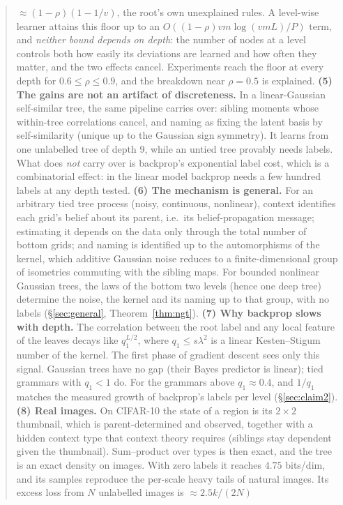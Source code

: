 \documentclass[11pt]{article}
\theoremstyle{definition}
\begin{document}
\begin{abstract}
$\approx(1-\rho)(1-1/v)$, the root's own unexplained rules. A level-wise learner attains this
floor up to an $O((1-\rho)vm\log(vmL)/P)$ term, and \emph{neither bound depends on depth}: the
number of nodes at a level controls both how easily its deviations are learned and how often they
matter, and the two effects cancel. Experiments reach the floor at every depth for
$0.6\le\rho\le0.9$, and the breakdown near $\rho=0.5$ is explained.
\textbf{(5) The gains are not an artifact of discreteness.} In a linear-Gaussian self-similar
tree, the same pipeline carries over: sibling moments whose within-tree correlations cancel, and
naming as fixing the latent basis by self-similarity (unique up to the Gaussian sign symmetry).
It learns from one unlabelled tree of depth 9, while an untied tree provably needs labels. What
does \emph{not} carry over is backprop's exponential label cost, which is a combinatorial effect:
in the linear model backprop needs a few hundred labels at any depth tested.
\textbf{(6) The mechanism is general.} For an arbitrary tied tree process (noisy, continuous,
nonlinear), context identifies each grid's belief about its parent, i.e.\ its belief-propagation
message; estimating it depends on the data only through the total number of bottom grids; and
naming is identified up to the automorphisms of the kernel, which additive Gaussian noise reduces
to a finite-dimensional group of isometries commuting with the sibling maps. For bounded nonlinear
Gaussian trees, the laws of the bottom two levels (hence one deep tree) determine the noise, the
kernel and its naming up to that group, with no labels (\S\ref{sec:general}, Theorem~\ref{thm:ngt}).
\textbf{(7) Why backprop slows with depth.} The correlation between the root label and any local
feature of the leaves decays like $q_1^{L/2}$, where $q_1\le s\lambda^2$ is a linear Kesten--Stigum
number of the kernel. The first phase of gradient descent sees only this signal. Gaussian trees have
no gap (their Bayes predictor is linear); tied grammars with $q_1<1$ do. For the grammars above
$q_1\approx0.4$, and $1/q_1$ matches the measured growth of backprop's labels per level
(\S\ref{sec:claim2}).
\textbf{(8) Real images.} On CIFAR-10 the state of a region is its $2\times2$ thumbnail, which is
parent-determined and observed, together with a hidden context type that context theory requires
(siblings stay dependent given the thumbnail). Sum--product over types is then exact, and the tree is an
exact density on images. With zero labels it reaches $4.75$ bits/dim, and its samples reproduce the
per-scale heavy tails of natural images. Its excess loss from $N$ unlabelled images is $\approx2.5k/(2N)$

\end{abstract}
\end{document}
